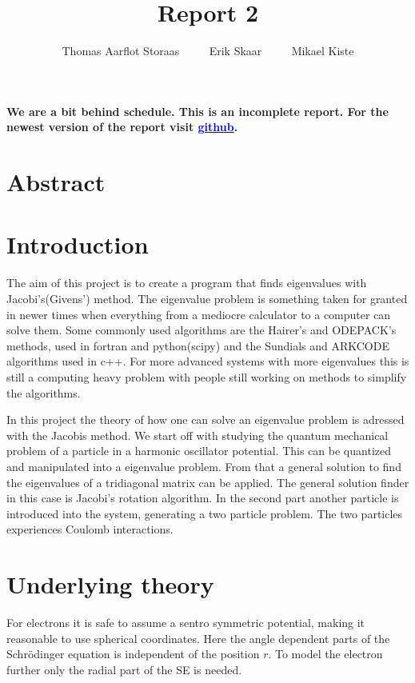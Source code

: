 

\author{Thomas Aarflot Storaas    $\qquad$    Erik Skaar  $\qquad$    Mikael Kiste}
\title{Report 2}
\maketitle


\textbf{We are a bit behind schedule. This is an incomplete report. For the newest version of the report visit \href{https://github.com/erikfsk/Project-2}{\textcolor{blue}{github}}.}

\section{Abstract}


\section{Introduction}
The aim of this project is to create a program that finds eigenvalues with Jacobi's(Givens') method. The eigenvalue problem is something taken for granted in newer times when everything from a mediocre calculator to a computer can solve them. Some commonly used algorithms are the Hairer's and ODEPACK's methods, used in fortran and python(scipy) and the Sundials and ARKCODE algorithms used in c++. For more advanced systems with more eigenvalues this is still a computing heavy problem with people still working on methods to simplify the algorithms.

In this project the theory of how one can solve an eigenvalue problem is adressed with the Jacobis method. We start off with studying the quantum mechanical problem of a particle in a harmonic oscillator potential.
This can be quantized and manipulated into a eigenvalue problem. From that a general solution to find the eigenvalues of a tridiagonal matrix can be applied. The general solution finder in this case is Jacobi's rotation algorithm. In the second part another particle is introduced into the system, generating a two particle problem. The two particles experiences Coulomb interactions.

\section{Underlying theory}

For electrons it is safe to assume a sentro symmetric potential, making it reasonable to use spherical coordinates. Here the angle dependent parts of the Schrödinger equation is independent of the position $r$. To model the electron further only the radial part of the SE is needed.

